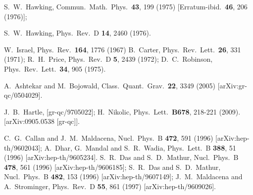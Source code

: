 \documentclass[11pt]{article}
\begin{document}
\begin{thebibliography}{10}


  S.~W.~Hawking,
  Commun.\ Math.\ Phys.\  {\bf 43}, 199 (1975)
  [Erratum-ibid.\  {\bf 46}, 206 (1976)];
  
  S.~W.~Hawking,
  Phys.\ Rev.\  D {\bf 14}, 2460 (1976).
  
  W.~Israel,
  Phys.\ Rev.\  {\bf 164}, 1776 (1967)
  B.~Carter,
  Phys.\ Rev.\ Lett.\  {\bf 26}, 331 (1971);
 R.~H.~Price,
  Phys.\ Rev.\  D {\bf 5}, 2439 (1972);
  D.~C.~Robinson,
  Phys.\ Rev.\ Lett.\  {\bf 34}, 905 (1975).

  A.~Ashtekar and M.~Bojowald,
  Class.\ Quant.\ Grav.\  {\bf 22}, 3349 (2005)
  [arXiv:gr-qc/0504029].

  J.~B.~Hartle,
   [gr-qc/9705022];
H.~Nikolic,
  Phys.\ Lett.\  {\bf B678}, 218-221 (2009).
  [arXiv:0905.0538 [gr-qc]].

C.~G.~Callan and J.~M.~Maldacena,
  Nucl.\ Phys.\  B {\bf 472}, 591 (1996)
  [arXiv:hep-th/9602043];
A.~Dhar, G.~Mandal and S.~R.~Wadia,
  Phys.\ Lett.\  B {\bf 388}, 51 (1996)
  [arXiv:hep-th/9605234].
S.~R.~Das and S.~D.~Mathur,
Nucl.\ Phys.\ B {\bf 478}, 561 (1996)
[arXiv:hep-th/9606185];
  S.~R.~Das and S.~D.~Mathur,
  Nucl.\ Phys.\  B {\bf 482}, 153 (1996)
  [arXiv:hep-th/9607149];
J.~M.~Maldacena and A.~Strominger,
Phys.\ Rev.\ D {\bf 55}, 861 (1997)
[arXiv:hep-th/9609026].
%


\end{thebibliography}
\end{document}

